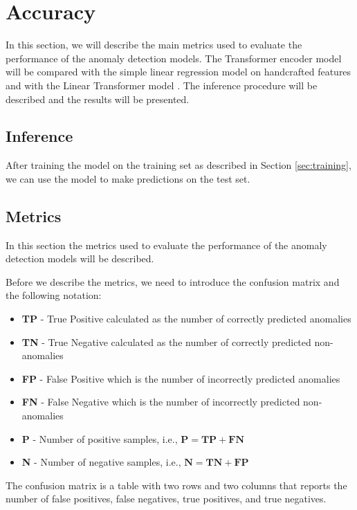 \documentclass[a4paper, twoside]{report}
\theoremstyle{definition}
\numberwithin{equation}{section}
\begin{document}
\section{Accuracy}

In this section, we will describe the main metrics used to evaluate the performance of the anomaly detection models.
The Transformer encoder model will be compared with the simple linear regression model on handcrafted features
and with the Linear Transformer model \cite{2006.16236}.
The inference procedure will be described and the results will be presented.

\subsection{Inference}
After training the model on the training set as described in Section \ref{sec:training}, we can use the model to make predictions on the test set.

\subsection{Metrics} \label{sec:metrics}


In this section the metrics used to evaluate the performance of the anomaly detection models will be described.

Before we describe the metrics, we need to introduce the confusion matrix and
the following notation:
\begin{itemize}
    \item \textbf{TP} - True Positive calculated as the number of correctly predicted anomalies
    \item \textbf{TN} - True Negative calculated as the number of correctly predicted non-anomalies
    \item \textbf{FP} - False Positive which is the number of incorrectly predicted anomalies
    \item \textbf{FN} - False Negative which is the number of incorrectly predicted non-anomalies
    \item \textbf{P} - Number of positive samples, i.e., $\textbf{P}=\textbf{TP}+\textbf{FN}$
    \item \textbf{N} - Number of negative samples, i.e., $\textbf{N}=\textbf{TN}+\textbf{FP}$
\end{itemize}

The confusion matrix is a table with two rows and two columns that reports the number of false positives, false negatives, true positives, and true negatives.
\end{document}
